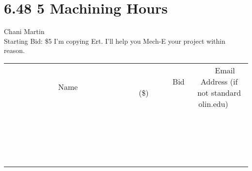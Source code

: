 \documentclass[11pt]{article}
\begin{document}
\section*{6.48 5 Machining Hours}
Chani Martin
\\
Starting Bid: \$5
\newline
I'm copying Ert. 
I'll help you Mech-E your project within reason.
\\[3ex]
\begin{tabular}{c c c}
~~~~~~~~~~~~~Name~~~~~~~~~~~~~ & ~~~~~~~~~Bid (\$)~~~~~~~~~  & ~~~Email Address (if not standard olin.edu)~~~\\
 & & \\
\hline
 & & \\
\hline
 & & \\
\hline
 & & \\
\hline
 & & \\
\hline
 & & \\
\hline
 & & \\
\hline
 & & \\
\hline
 & & \\
\hline
 & & \\
\hline
 & & \\
\hline
 & & \\
\hline
 & & \\
\hline
 & & \\
\hline
 & & \\
\hline
 & & \\
\hline
 & & \\
\hline
 & & \\
\hline
 & & \\
\hline
\end{tabular}
\newpage
\end{document}
